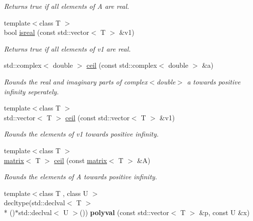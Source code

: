 \begin{DoxyCompactItemize}
\begin{DoxyCompactList}\small\item\em Returns true if all elements of A are real. \end{DoxyCompactList}\item 
\hypertarget{namespacekeycpp_ad811cd86faad44bdf322b55d332fee29}{{\footnotesize template$<$class T $>$ }\\bool \hyperlink{namespacekeycpp_ad811cd86faad44bdf322b55d332fee29}{isreal} (const std\-::vector$<$ T $>$ \&v1)}\label{namespacekeycpp_ad811cd86faad44bdf322b55d332fee29}

\begin{DoxyCompactList}\small\item\em Returns true if all elements of v1 are real. \end{DoxyCompactList}\item 
\hypertarget{namespacekeycpp_a005c1190f7087fb1d2545c38c080fd1a}{std\-::complex$<$ double $>$ \hyperlink{namespacekeycpp_a005c1190f7087fb1d2545c38c080fd1a}{ceil} (const std\-::complex$<$ double $>$ \&a)}\label{namespacekeycpp_a005c1190f7087fb1d2545c38c080fd1a}

\begin{DoxyCompactList}\small\item\em Rounds the real and imaginary parts of complex$<$double$>$ a towards positive infinity seperately. \end{DoxyCompactList}\item 
\hypertarget{namespacekeycpp_adb46ebfbb914f186bcb1859f39dfae91}{{\footnotesize template$<$class T $>$ }\\std\-::vector$<$ T $>$ \hyperlink{namespacekeycpp_adb46ebfbb914f186bcb1859f39dfae91}{ceil} (const std\-::vector$<$ T $>$ \&v1)}\label{namespacekeycpp_adb46ebfbb914f186bcb1859f39dfae91}

\begin{DoxyCompactList}\small\item\em Rounds the elements of v1 towards positive infinity. \end{DoxyCompactList}\item 
\hypertarget{namespacekeycpp_a4bba31744fef3693901a075fda07857c}{{\footnotesize template$<$class T $>$ }\\\hyperlink{classkeycpp_1_1matrix}{matrix}$<$ T $>$ \hyperlink{namespacekeycpp_a4bba31744fef3693901a075fda07857c}{ceil} (const \hyperlink{classkeycpp_1_1matrix}{matrix}$<$ T $>$ \&A)}\label{namespacekeycpp_a4bba31744fef3693901a075fda07857c}

\begin{DoxyCompactList}\small\item\em Rounds the elements of A towards positive infinity. \end{DoxyCompactList}\item 
\hypertarget{namespacekeycpp_a136df5d07e95d472b1a38d3fd71b3a3f}{{\footnotesize template$<$class T , class U $>$ }\\decltype(std\-::declval$<$ T $>$\\*
()$\ast$std\-::declval$<$ U $>$()) {\bfseries polyval} (const std\-::vector$<$ T $>$ \&p, const U \&x)}\label{namespacekeycpp_a136df5d07e95d472b1a38d3fd71b3a3f}


\end{DoxyCompactItemize}
